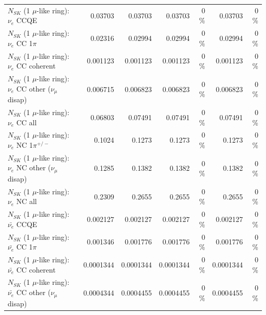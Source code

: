 \begin{table}
\begin{tabular}{| l | r | r | r  r | r  r |}
\hline
\hline
\hline
                                      $N_{SK}$ (1 $\mu$-like ring): $\nu_e$ CCQE &         0.03703 &         0.03703 &         0.03703 &        0 \%  &         0.03703 &        0 \%  \\ 
                                 $N_{SK}$ (1 $\mu$-like ring): $\nu_e$ CC 1$\pi$ &         0.02316 &         0.02994 &         0.02994 &        0 \%  &         0.02994 &        0 \%  \\ 
                               $N_{SK}$ (1 $\mu$-like ring): $\nu_e$ CC coherent &        0.001123 &        0.001123 &        0.001123 &        0 \%  &        0.001123 &        0 \%  \\ 
                $N_{SK}$ (1 $\mu$-like ring): $\nu_e$ CC other ($\nu_\mu$ disap) &        0.006715 &        0.006823 &        0.006823 &        0 \%  &        0.006823 &        0 \%  \\ 
                                  $N_{SK}$ (1 $\mu$-like ring): $\nu_{e}$ CC all &         0.06803 &         0.07491 &         0.07491 &        0 \%  &         0.07491 &        0 \%  \\ 
\hline
                           $N_{SK}$ (1 $\mu$-like ring): $\nu_e$ NC 1$\pi^{+/-}$ &          0.1024 &          0.1273 &          0.1273 &        0 \%  &          0.1273 &        0 \%  \\ 
                $N_{SK}$ (1 $\mu$-like ring): $\nu_e$ NC other ($\nu_\mu$ disap) &          0.1285 &          0.1382 &          0.1382 &        0 \%  &          0.1382 &        0 \%  \\ 
                                  $N_{SK}$ (1 $\mu$-like ring): $\nu_{e}$ NC all &          0.2309 &          0.2655 &          0.2655 &        0 \%  &          0.2655 &        0 \%  \\ 
\hline
\hline
\hline
                                $N_{SK}$ (1 $\mu$-like ring): $\bar{\nu_e}$ CCQE &        0.002127 &        0.002127 &        0.002127 &        0 \%  &        0.002127 &        0 \%  \\ 
                           $N_{SK}$ (1 $\mu$-like ring): $\bar{\nu_e}$ CC 1$\pi$ &        0.001346 &        0.001776 &        0.001776 &        0 \%  &        0.001776 &        0 \%  \\ 
                         $N_{SK}$ (1 $\mu$-like ring): $\bar{\nu_e}$ CC coherent &       0.0001344 &       0.0001344 &       0.0001344 &        0 \%  &       0.0001344 &        0 \%  \\ 
          $N_{SK}$ (1 $\mu$-like ring): $\bar{\nu_e}$ CC other ($\nu_\mu$ disap) &       0.0004344 &       0.0004455 &       0.0004455 &        0 \%  &       0.0004455 &        0 \%  \\ 

\end{tabular}
\end{table}
